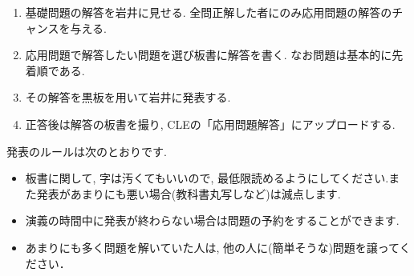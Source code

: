 \documentclass[dvipdfmx,a4paper,11pt]{article}
\theoremstyle{definition}
\begin{document}
\newpage
{}

\begin{enumerate}[label=\textbf{手順}\arabic*.]
  \setlength{\parskip}{0cm} 
  \setlength{\itemsep}{0cm} 
\item 基礎問題の解答を岩井に見せる. 全問正解した者にのみ応用問題の解答のチャンスを与える. 
\item 応用問題で解答したい問題を選び板書に解答を書く. なお問題は基本的に先着順である.
\item その解答を黒板を用いて岩井に発表する. 
\item 正答後は解答の板書を撮り, CLEの「応用問題解答」にアップロードする. 
\end{enumerate}

\hspace{-18pt}発表のルールは次のとおりです.
\begin{itemize}
  \setlength{\parskip}{0cm} 
  \setlength{\itemsep}{0cm} 
\item 板書に関して, 字は汚くてもいいので, 最低限読めるようにしてください.また発表があまりにも悪い場合(教科書丸写しなど)は減点します.
\item 演義の時間中に発表が終わらない場合は問題の予約をすることができます. 
\item あまりにも多く問題を解いていた人は, 他の人に(簡単そうな)問題を譲ってください．
\end{itemize}
\end{document}
